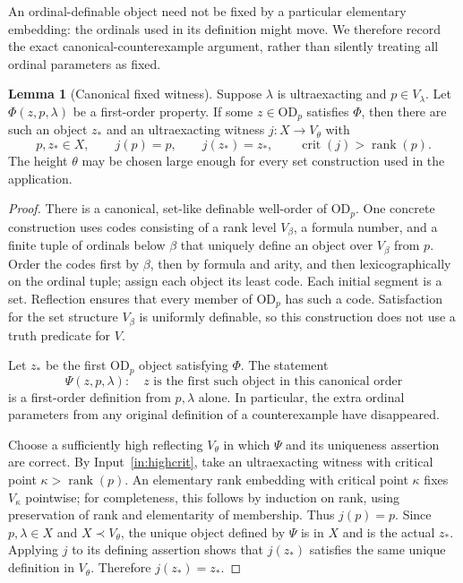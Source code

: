 \documentclass[11pt,letterpaper]{article}
\theoremstyle{definition}
\newtheorem{lemma}[definition]{Lemma}
\numberwithin{equation}{section}
\newcommand{\OD}{\mathrm{OD}}
\newcommand{\crit}{\operatorname{crit}}
\newcommand{\rank}{\operatorname{rank}}
\begin{document}
An ordinal-definable object need not be fixed by a particular elementary embedding: the ordinals used in its definition might move. We therefore record the exact canonical-counterexample argument, rather than silently treating all ordinal parameters as fixed.

\begin{lemma}[Canonical fixed witness]\label{lem:canonical}
Suppose $\lambda$ is ultraexacting and $p\in V_\lambda$. Let $\Phi(z,p,\lambda)$ be a first-order property. If some $z\in\OD_p$ satisfies $\Phi$, then there are such an object $z_*$ and an ultraexacting witness $j:X\to V_\theta$ with
\[
 p,z_*\in X,
 \qquad j(p)=p,
 \qquad j(z_*)=z_*,
 \qquad \crit(j)>\rank(p).
\]
The height $\theta$ may be chosen large enough for every set construction used in the application.
\end{lemma}

\begin{proof}
There is a canonical, set-like definable well-order of $\OD_p$. One concrete construction uses codes consisting of a rank level $V_\beta$, a formula number, and a finite tuple of ordinals below $\beta$ that uniquely define an object over $V_\beta$ from $p$. Order the codes first by $\beta$, then by formula and arity, and then lexicographically on the ordinal tuple; assign each object its least code. Each initial segment is a set. Reflection ensures that every member of $\OD_p$ has such a code. Satisfaction for the set structure $V_\beta$ is uniformly definable, so this construction does not use a truth predicate for $V$.

Let $z_*$ be the first $\OD_p$ object satisfying $\Phi$. The statement
\[
 \Psi(z,p,\lambda):\quad
 z\text{ is the first such object in this canonical order}
\]
is a first-order definition from $p,\lambda$ alone. In particular, the extra ordinal parameters from any original definition of a counterexample have disappeared.

Choose a sufficiently high reflecting $V_\theta$ in which $\Psi$ and its uniqueness assertion are correct. By Input~\ref{in:highcrit}, take an ultraexacting witness with critical point $\kappa>\rank(p)$. An elementary rank embedding with critical point $\kappa$ fixes $V_\kappa$ pointwise; for completeness, this follows by induction on rank, using preservation of rank and elementarity of membership. Thus $j(p)=p$. Since $p,\lambda\in X$ and $X\prec V_\theta$, the unique object defined by $\Psi$ is in $X$ and is the actual $z_*$. Applying $j$ to its defining assertion shows that $j(z_*)$ satisfies the same unique definition in $V_\theta$. Therefore $j(z_*)=z_*$.
\end{proof}
\end{document}
